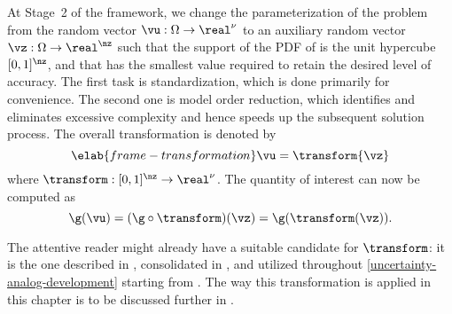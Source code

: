 At Stage~2 of the framework, we change the parameterization of the problem from
the random vector $\vu: \Omega \to \real^\nu$ to an auxiliary random vector
$\vz: \Omega \to \real^\nz$ such that the support of the \ac{PDF} of \vz is the
unit hypercube $[0, 1]^\nz$, and that \nz has the smallest value required to
retain the desired level of accuracy. The first task is standardization, which
is done primarily for convenience. The second one is model order reduction,
which identifies and eliminates excessive complexity and hence speeds up the
subsequent solution process. The overall transformation is denoted by
\begin{equation} \elab{frame-transformation}
  \vu = \transform{\vz}
\end{equation}
where $\transform: [0, 1]^\nz \to \real^\nu$. The quantity of interest \g can
now be computed as
\[
  \g(\vu) = (\g \circ \transform)(\vz) = \g(\transform(\vz)).
\]

The attentive reader might already have a suitable candidate for $\transform$:
it is the one described in , consolidated in
, and utilized throughout
\cref{uncertainty-analog-development} starting from .
The way this transformation is applied in this chapter is to be discussed
further in .
